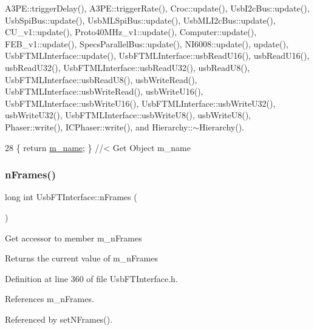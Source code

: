 A3\+P\+E\+::trigger\+Delay(), A3\+P\+E\+::trigger\+Rate(), Croc\+::update(), Usb\+I2c\+Bus\+::update(), Usb\+Spi\+Bus\+::update(), Usb\+M\+L\+Spi\+Bus\+::update(), Usb\+M\+L\+I2c\+Bus\+::update(), C\+U\+\_\+v1\+::update(), Proto40\+M\+Hz\+\_\+v1\+::update(), Computer\+::update(), F\+E\+B\+\_\+v1\+::update(), Specs\+Parallel\+Bus\+::update(), N\+I6008\+::update(), update(), Usb\+F\+T\+M\+L\+Interface\+::update(), Usb\+F\+T\+M\+L\+Interface\+::usb\+Read\+U16(), usb\+Read\+U16(), usb\+Read\+U32(), Usb\+F\+T\+M\+L\+Interface\+::usb\+Read\+U32(), usb\+Read\+U8(), Usb\+F\+T\+M\+L\+Interface\+::usb\+Read\+U8(), usb\+Write\+Read(), Usb\+F\+T\+M\+L\+Interface\+::usb\+Write\+Read(), usb\+Write\+U16(), Usb\+F\+T\+M\+L\+Interface\+::usb\+Write\+U16(), Usb\+F\+T\+M\+L\+Interface\+::usb\+Write\+U32(), usb\+Write\+U32(), Usb\+F\+T\+M\+L\+Interface\+::usb\+Write\+U8(), usb\+Write\+U8(), Phaser\+::write(), I\+C\+Phaser\+::write(), and Hierarchy\+::$\sim$\+Hierarchy().


\begin{DoxyCode}
28 \{ \textcolor{keywordflow}{return} \hyperlink{classObject_a8b83c95c705d2c3ba0d081fe1710f48d}{m\_name}; \} \textcolor{comment}{//< Get Object m\_name}
\end{DoxyCode}
\mbox{\label{classUsbFTInterface_a694f5cb1d38d4369a597ad6761762c0e}} 
\subsubsection{\texorpdfstring{n\+Frames()}{nFrames()}}
{\footnotesize\ttfamily long int Usb\+F\+T\+Interface\+::n\+Frames (\begin{DoxyParamCaption}{ }\end{DoxyParamCaption})\hspace{0.3cm}{\ttfamily [inline]}}

Get accessor to member m\+\_\+n\+Frames \begin{DoxyReturn}{Returns}
the current value of m\+\_\+n\+Frames 
\end{DoxyReturn}


Definition at line 360 of file Usb\+F\+T\+Interface.\+h.



References m\+\_\+n\+Frames.



Referenced by set\+N\+Frames().



